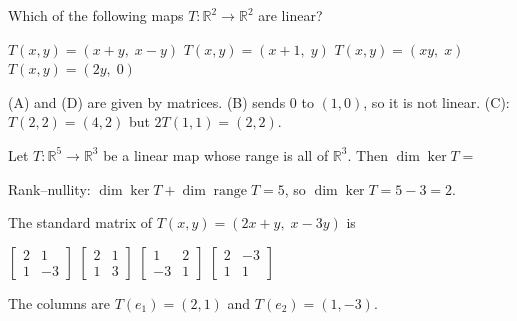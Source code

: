 
\begin{question}[id=lt-1, type=msq]
Which of the following maps $T : \mathbb{R}^2 \to \mathbb{R}^2$ are linear?
\begin{options}
  \correct $T(x, y) = (x + y,\; x - y)$
  \option $T(x, y) = (x + 1,\; y)$
  \option $T(x, y) = (xy,\; x)$
  \correct $T(x, y) = (2y,\; 0)$
\end{options}
\begin{solution}
(A) and (D) are given by matrices. (B) sends 0 to $(1, 0)$, so it is not linear. (C): $T(2, 2) = (4, 2)$ but $2T(1, 1) = (2, 2)$.
\end{solution}
\end{question}

\begin{question}[id=lt-2]
Let $T : \mathbb{R}^5 \to \mathbb{R}^3$ be a linear map whose range is all of $\mathbb{R}^3$. Then $\dim \ker T =$
\begin{solution}
Rank--nullity: $\dim \ker T + \dim \operatorname{range} T = 5$, so $\dim \ker T = 5 - 3 = 2$.
\end{solution}
\end{question}

\begin{question}[id=lt-3]
The standard matrix of $T(x, y) = (2x + y,\; x - 3y)$ is
\begin{options}
  \correct $\begin{bmatrix} 2 & 1 \\ 1 & -3 \end{bmatrix}$
  \option $\begin{bmatrix} 2 & 1 \\ 1 & 3 \end{bmatrix}$
  \option $\begin{bmatrix} 1 & 2 \\ -3 & 1 \end{bmatrix}$
  \option $\begin{bmatrix} 2 & -3 \\ 1 & 1 \end{bmatrix}$
\end{options}
\begin{solution}
The columns are $T(e_1) = (2, 1)$ and $T(e_2) = (1, -3)$.
\end{solution}
\end{question}

